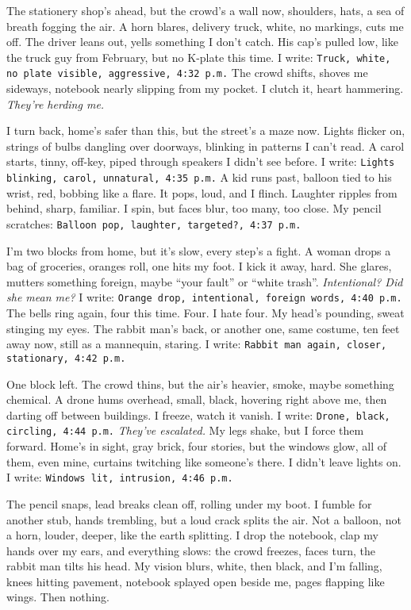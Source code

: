 \documentclass[12pt]{article}
\newcommand{\note}[1]{\texttt{#1}}
\begin{document}
The stationery shop’s ahead, but the crowd’s a wall now, shoulders, hats, a sea of breath fogging the air. A horn blares, delivery truck, white, no markings, cuts me off. The driver leans out, yells something I don’t catch. His cap’s pulled low, like the truck guy from February, but no K-plate this time. I write: \note{Truck, white, no plate visible, aggressive, 4:32 p.m.} The crowd shifts, shoves me sideways, notebook nearly slipping from my pocket. I clutch it, heart hammering. \textit{They’re herding me.} 

I turn back, home’s safer than this, but the street’s a maze now. Lights flicker on, strings of bulbs dangling over doorways, blinking in patterns I can’t read. A carol starts, tinny, off-key, piped through speakers I didn’t see before. I write: \note{Lights blinking, carol, unnatural, 4:35 p.m.} A kid runs past, balloon tied to his wrist, red, bobbing like a flare. It pops, loud, and I flinch. Laughter ripples from behind, sharp, familiar. I spin, but faces blur, too many, too close. My pencil scratches: \note{Balloon pop, laughter, targeted?, 4:37 p.m.}

I’m two blocks from home, but it’s slow, every step’s a fight. A woman drops a bag of groceries, oranges roll, one hits my foot. I kick it away, hard. She glares, mutters something foreign, maybe “your fault” or “white trash”. \textit{Intentional? Did she mean me?} I write: \note{Orange drop, intentional, foreign words, 4:40 p.m.} The bells ring again, four this time. Four. I hate four. My head’s pounding, sweat stinging my eyes. The rabbit man’s back, or another one, same costume, ten feet away now, still as a mannequin, staring. I write: \note{Rabbit man again, closer, stationary, 4:42 p.m.}

One block left. The crowd thins, but the air’s heavier, smoke, maybe something chemical. A drone hums overhead, small, black, hovering right above me, then darting off between buildings. I freeze, watch it vanish. I write: \note{Drone, black, circling, 4:44 p.m.} \textit{They’ve escalated.} My legs shake, but I force them forward. Home’s in sight, gray brick, four stories, but the windows glow, all of them, even mine, curtains twitching like someone’s there. I didn’t leave lights on. I write: \note{Windows lit, intrusion, 4:46 p.m.}

The pencil snaps, lead breaks clean off, rolling under my boot. I fumble for another stub, hands trembling, but a loud crack splits the air. Not a balloon, not a horn, louder, deeper, like the earth splitting. I drop the notebook, clap my hands over my ears, and everything slows: the crowd freezes, faces turn, the rabbit man tilts his head. My vision blurs, white, then black, and I’m falling, knees hitting pavement, notebook splayed open beside me, pages flapping like wings. Then nothing.
\end{document}
